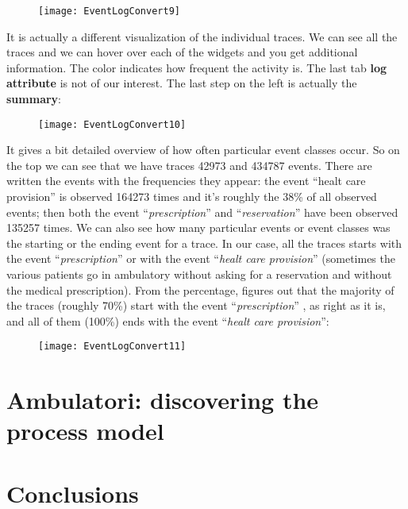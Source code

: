 \documentclass[paper=a4, fontsize=11pt]{scrartcl} %
\numberwithin{equation}{section} %
\numberwithin{figure}{section} %
\numberwithin{table}{section} %
\begin{document}
\newpage
\begin{figure} [htbp]
\centering
\texttt{[image: EventLogConvert9]}
\end{figure}
It is actually a different visualization of the individual traces. We can see all the traces and we can hover over each of the widgets and you get additional information. The color indicates how frequent the activity is. The last tab \textbf{log attribute} is not of our interest. The last step on the left is actually the \textbf{summary}:
\newpage
\begin{figure} [htbp]
\centering
\texttt{[image: EventLogConvert10]}
\end{figure}
It gives a bit detailed overview of how often particular event classes occur. So on the top we can see that we have  traces 42973 and 434787 events. There are written the events with the frequencies they appear: the event ``healt care provision'' is observed 164273 times and it's roughly the 38\% of all observed events; then both the event ``\textit{prescription}'' and ``\textit{reservation}'' have been observed 135257 times. We can also see how many particular events or event classes was the starting or the ending event for a trace. In our case, all the traces starts with the event ``\textit{prescription}'' or with the event ``\textit{healt care provision}'' (sometimes the various patients go in ambulatory without asking for a reservation and without the medical prescription). From the percentage, figures out that the majority of the traces (roughly 70\%) start with the event ``\textit{prescription}'' , as right as it is, and all of them (100\%) ends with the event ``\textit{healt care provision}'':
\newpage
\begin{figure} [htbp]
\centering
\texttt{[image: EventLogConvert11]}
\end{figure}
\section{Ambulatori: discovering the process model}
\section{Conclusions}
\end{document}
